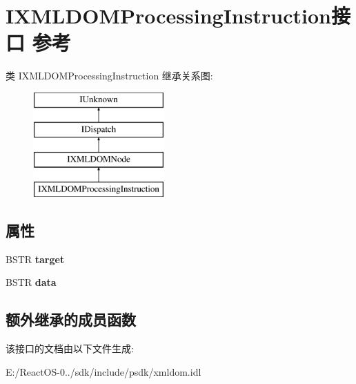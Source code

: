 \hypertarget{interface_i_x_m_l_d_o_m_processing_instruction}{}\section{I\+X\+M\+L\+D\+O\+M\+Processing\+Instruction接口 参考}
\label{interface_i_x_m_l_d_o_m_processing_instruction}
类 I\+X\+M\+L\+D\+O\+M\+Processing\+Instruction 继承关系图\+:\begin{figure}[H]
\begin{center}
\leavevmode
\includegraphics[height=4.000000cm]{interface_i_x_m_l_d_o_m_processing_instruction}
\end{center}
\end{figure}
\subsection*{属性}
\begin{DoxyCompactItemize}
\item 
\mbox{\label{interface_i_x_m_l_d_o_m_processing_instruction_afdb59df34c3503cd2d36814910697bc3}} 
B\+S\+TR {\bfseries target}
\item 
\mbox{\label{interface_i_x_m_l_d_o_m_processing_instruction_a7ee84ce220dac47c89c9ee9c9f0fc1ac}} 
B\+S\+TR {\bfseries data}
\end{DoxyCompactItemize}
\subsection*{额外继承的成员函数}


该接口的文档由以下文件生成\+:\begin{DoxyCompactItemize}
\item 
E\+:/\+React\+O\+S-\/0../sdk/include/psdk/xmldom.\+idl\end{DoxyCompactItemize}
